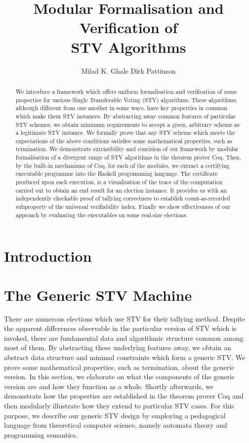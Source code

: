 \documentclass{llncs}
\title{Modular Formalisation and Verification of \\STV Algorithms}
\author{Milad K. Ghale 
\hspace*{0.5cm} Dirk Pattinson}
\institute{Research School of Computer Science, ANU, Canberra}
\begin{document}
\maketitle
\pagestyle{plain}
\thispagestyle{empty}
\begin{abstract}
We introduce a framework which offers uniform formalisation and verification of some properties for various Single Transferable Voting (STV) algorithms.  These algorithms, although different from one another in some ways, have key properties in common which make them STV instances. By abstracting away common features of particular STV schemes, we obtain minimum requirements to accept a given, arbitrary scheme as a legitimate STV instance. We formally prove that any STV scheme which meets the  expectations of the above conditions satisfies some mathematical properties, such as termination. We demonstrate extensibility and concision of our framework by modular formalisation of a divergent range of STV algorithms in the theorem prover Coq. Then, by the built-in mechanisms of Coq, for each of the modules, we extract a certifying executable programme into the Haskell programming language. The certificate produced upon each execution, is a visualisation of the trace of the computation carried out to obtain an end result for an election instance. It provides us with an independently checkable proof of tallying correctness to establish count-as-recorded subproperty of the universal verifiability index. Finally we show effectiveness of our approach by evaluating the executables on some real-size elections. 
\end{abstract}
\section{Introduction}   
\section{The Generic STV Machine}       
There are numerous elections which use STV for their tallying method. Despite the apparent differences observable in the particular version of STV which is invoked, there are fundamental data and algorithmic structure common among most of them. By abstracting these underlying features away, we obtain an abstract data structure and minimal constraints which form a generic STV. We prove some mathematical properties, such as termination, about the generic version.  In this section, we elaborate on what the components of the generic version are and how they function as a whole. Shortly afterwards, we demonstrate how the properties  are established in the theorem prover Coq and then modularly illustrate how they extend to particular STV cases. For this purpose, we describe our generic STV design by employing a pedagogical language from theoretical computer science, namely automata theory and programming semantics.  
\end{document}
